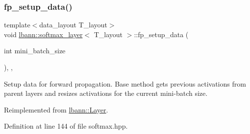\mbox{\label{classlbann_1_1softmax__layer_a313aa2f82acfbca8f3852378d00c22c3}} 
\subsubsection{\texorpdfstring{fp\+\_\+setup\+\_\+data()}{fp\_setup\_data()}}
{\footnotesize\ttfamily template$<$data\+\_\+layout T\+\_\+layout$>$ \\
void \hyperlink{classlbann_1_1softmax__layer}{lbann\+::softmax\+\_\+layer}$<$ T\+\_\+layout $>$\+::fp\+\_\+setup\+\_\+data (\begin{DoxyParamCaption}\item[{int}]{mini\+\_\+batch\+\_\+size }\end{DoxyParamCaption})\hspace{0.3cm}{\ttfamily [inline]}, {\ttfamily [override]}, {\ttfamily [virtual]}}

Setup data for forward propagation. Base method gets previous activations from parent layers and resizes activations for the current mini-\/batch size. 

Reimplemented from \hyperlink{classlbann_1_1Layer_af311d901a5f71e4c749454647e9fd9c7}{lbann\+::\+Layer}.



Definition at line 144 of file softmax.\+hpp.


